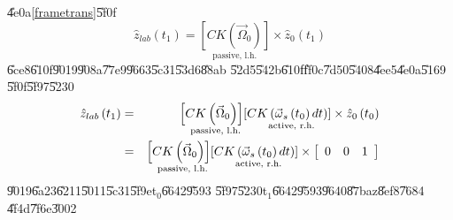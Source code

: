 \documentclass[12pt,a4paper]{article}
\begin{document}
\U{4e0a}\ref{frametrans}\U{5f0f}%
\begin{equation*}
\hat{z}_{lab}\left( t_{1}\right) =\underset{\text{passive, l.h.}}{\left[
CK\left( \vec{\Omega}_{0}\right) \right] }\times \hat{z}_{0}\left(
t_{1}\right)
\end{equation*}%
\U{6ce8}\U{610f}\U{9019}\U{908a}\U{77e9}\U{9663}\U{5c31}\U{53d6}\U{88ab}%
\U{52d5}\U{542b}\U{610f}\U{ff0c}\U{7d50}\U{5408}\U{4ee5}\U{4e0a}\U{5169}%
\U{5f0f}\U{5f97}\U{5230}%
\begin{eqnarray*}
\hat{z}_{lab}\left( t_{1}\right) &=&\underset{\text{passive, l.h.}}{\left[
CK\left( \vec{\Omega}_{0}\right) \right] }\underset{\text{active, r.h.}}{%
\left[ CK\left( \vec{\omega}_{s}\left( t_{0}\right) dt\right) \right] }%
\times \hat{z}_{0}\left( t_{0}\right) \\
&=&\underset{\text{passive, l.h.}}{\left[ CK\left( \vec{\Omega}_{0}\right) %
\right] }\underset{\text{active, r.h.}}{\left[ CK\left( \vec{\omega}%
_{s}\left( t_{0}\right) dt\right) \right] }\times \left[ 
\begin{array}{ccc}
0 & 0 & 1%
\end{array}%
\right]
\end{eqnarray*}%
\U{9019}\U{6a23}\U{6211}\U{5011}\U{5c31}\U{5f9e}t$_{0}$\U{6642}\U{9593}%
\U{5f97}\U{5230}t$_{1}$\U{6642}\U{9593}\U{9640}\U{87ba}z\U{8ef8}\U{7684}%
\U{4f4d}\U{7f6e}\U{3002}
\end{document}
